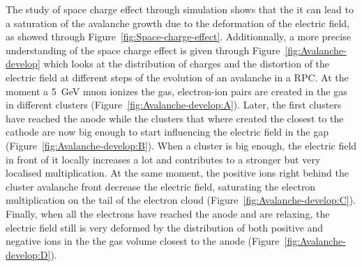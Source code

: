 	The study of space charge effect through simulation shows that the it can lead to a saturation of the avalanche growth due to the deformation of the electric field, as showed through Figure~\ref{fig:Space-charge-effect}. Additionnally, a more precise understanding of the space charge effect is given through Figure~\ref{fig:Avalanche-develop} which looks at the distribution of charges and the distortion of the electric field at different steps of the evolution of an avalanche in a RPC. At the moment a \SI{5}{GeV} muon ionizes the gas, electron-ion pairs are created in the gas in different clusters (Figure~\ref{fig:Avalanche-develop:A}). Later, the first clusters have reached the anode while the clusters that where created the closest to the cathode are now big enough to start influencing the electric field in the gap (Figure~\ref{fig:Avalanche-develop:B}). When a cluster is big enough, the electric field in front of it locally increases a lot and contributes to a stronger but very localised multiplication. At the same moment, the positive ions right behind the cluster avalanche front decrease the electric field, saturating the electron multiplication on the tail of the electron cloud (Figure~\ref{fig:Avalanche-develop:C}). Finally, when all the electrons have reached the anode and are relaxing, the electric field still is very deformed by the distribution of both positive and negative ions in the the gas volume closest to the anode (Figure~\ref{fig:Avalanche-develop:D}).
	
